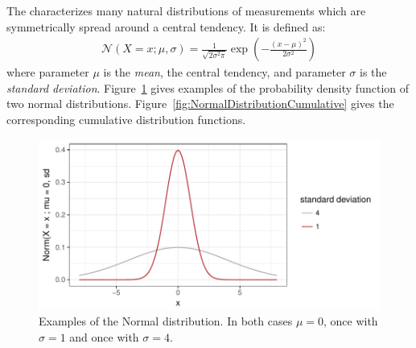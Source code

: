 \documentclass[nobib,nofonts]{tufte-handout}
\begin{document}
\begin{example}
  The  characterizes many natural distributions of
  measurements which are symmetrically spread around a central tendency. It is defined as:
  \begin{align*}
    \mathcal{N}(X = x ; \mu, \sigma) = \frac{1}{\sqrt{2 \sigma^2 \pi}} \exp \left ( -
      \frac{(x-\mu)^2}{2 \sigma^2} \right)
  \end{align*}
  where parameter $\mu$ is the \emph{mean}, the central tendency, and parameter $\sigma$ is the
  \emph{standard deviation}. Figure~\ref{fig:NormalDistribution} gives examples of the
  probability density function of two normal
  distributions. Figure~\ref{fig:NormalDistributionCumulative} gives the corresponding
  cumulative distribution functions.

\begin{figure}
  \centering
  \includegraphics[width=\textwidth]{00-pics/05_01_normal-distribution.pdf}
  \caption{Examples of the Normal distribution. In both cases $\mu = 0$, once with $\sigma = 1$
    and once with $\sigma = 4$.}
  \label{fig:NormalDistribution}
\end{figure}


\end{example}
\end{document}

